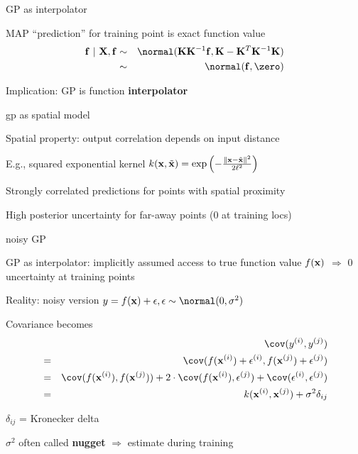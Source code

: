 \documentclass[11pt,compress,t,notes=noshow, xcolor=table]{beamer}
\begin{document}
\begin{framei}[sep=L]{GP as interpolator}
\item MAP ``prediction'' for training point is exact function value
\begin{eqnarray*}
\fv ~|~ \Xmat, \fv &\sim& \normal(\Kmat\Kinv\fv, \Kmat - \Kmat^T \Kinv \Kmat) \\ &\sim& \normal(\fv, \zero)
\end{eqnarray*}
\item Implication: GP is function \textbf{interpolator}
\vfill
{}
\end{framei}

\begin{framei}[sep=L]{gp as spatial model}
\item Spatial property: output correlation depends on input distance
\item E.g., squared exponential kernel $k(\mathbf{x}, \tilde{\mathbf{x}}) = \exp \left(-\frac{\| \mathbf{x} - \tilde{\mathbf{x}} \|^2}{2\ell^2} \right)$
\item Strongly correlated predictions for points with spatial proximity
\item High posterior uncertainty for far-away points (0 at training locs)
\vfill
{}
\end{framei}

\begin{framei}[sep=M]{noisy GP}
\item GP as interpolator: implicitly assumed access to true function value $f(\mathbf{x})$ $\Rightarrow$ 0 uncertainty at training points
\item Reality: noisy version
$y = \fx + \eps, \eps \sim\normal(0, \sigma^2)$
\item Covariance becomes 
\begin{eqnarray*} 
&&\cov(y^{(i)}, y^{(j)}) \\ &=&  \cov (f(\xi) + \epsilon^{(i)}, f(\xi[j]) + \epsilon^{(j)}) \\
&=& \cov(f(\xi), f(\xi[j])) + 2 \cdot \cov(f(\xi), \epsilon^{(j)}) + \cov(\epsilon^{(i)}, \epsilon^{(j)}) 
\\ &=& \kxij + \sigma^2 \delta_{ij}
\end{eqnarray*}
\item $\delta_{ij}$ = Kronecker delta
\item $\sigma^2$ often called \textbf{nugget} $\Rightarrow$ estimate during training
\end{framei}
\end{document}
